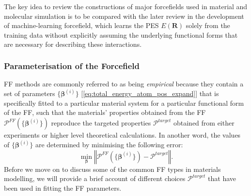 The key idea to review the constructions of major  forcefields used in material and molecular simulation is to be compared with the later review in the development of machine-learning forcefield, which learns the PES $E(\bm{R})$ solely from the training data without explicitly assuming the underlying functional forms that are necessary for describing these interactions.

\subsubsection{Parameterisation of the Forcefield}

FF methods are commonly referred to as being \emph{empirical} because they contain a set of parameters $\{\bm{\beta}^{(i)}\}$ [\cref{eq:total_energy_atom_pos_expand}] that is specifically fitted to a particular material system for a particular functional form of the FF, such that the materials' properties obtained from the FF  $\mathcal{P}^{FF}(\{\bm{\beta}^{(i)}\})$ reproduce the targeted properties $\mathcal{P}^{target}$ obtained from either experiments or higher level theoretical calculations. In another word, the values of $\{\bm{\beta}^{(i)}\}$  are determined by minimising the following error:
\begin{equation}\label{eq:FF_fitting}
\min_{\bm{\beta}}\left\Vert \mathcal{P}^{FF}(\{\bm{\beta}^{(i)}\})-\mathcal{P}^{target}\right\Vert.
\end{equation}
Before we move on to discuss some of the common FF types in materials modelling, we will provide a brief account of different choices $\mathcal{P}^{target}$ that have been used in fitting the FF parameters.

